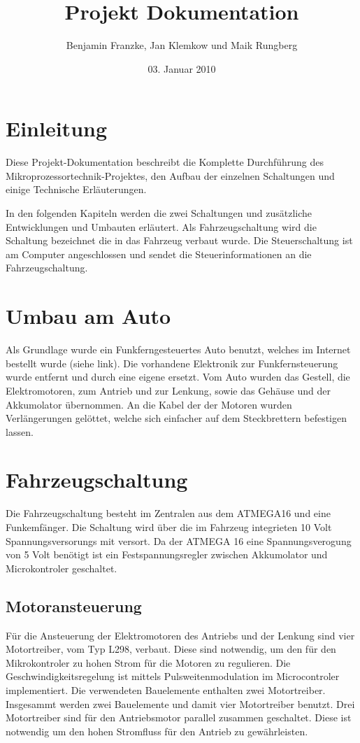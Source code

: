 \documentclass{scrartcl}
\title{Projekt Dokumentation}
\author{Benjamin Franzke, Jan Klemkow und Maik Rungberg}
\date{03. Januar 2010}
\begin{document}
\maketitle
\tableofcontents

\section{Einleitung} %
	Diese Projekt-Dokumentation beschreibt die Komplette Durchführung des Mikroprozessortechnik-Projektes,
	den Aufbau der einzelnen Schaltungen und einige Technische Erläuterungen.

	In den folgenden Kapiteln werden die zwei Schaltungen und zusätzliche Entwicklungen und Umbauten erläutert.
	Als Fahrzeugschaltung wird die Schaltung bezeichnet die in das Fahrzeug verbaut wurde.
	Die Steuerschaltung ist am Computer angeschlossen und sendet die Steuerinformationen an die Fahrzeugschaltung.

\section{Umbau am Auto} %
	Als Grundlage wurde ein Funkferngesteuertes Auto benutzt,
	welches im Internet bestellt wurde (siehe link).
	Die vorhandene Elektronik zur Funkfernsteuerung wurde entfernt und durch eine eigene ersetzt.
	Vom Auto wurden das Gestell, die Elektromotoren, zum Antrieb und zur Lenkung,
	sowie das Gehäuse und der Akkumolator übernommen.
	An die Kabel der der Motoren wurden Verlängerungen gelöttet,
	welche sich einfacher auf dem Steckbrettern befestigen lassen.

\section{Fahrzeugschaltung} %
	Die Fahrzeugschaltung besteht im Zentralen aus dem ATMEGA16 und eine Funkemfänger.
	Die Schaltung wird über die im Fahrzeug integrieten 10 Volt Spannungsversorungs mit versort.
	Da der ATMEGA 16 eine Spannungsverogung von 5 Volt benötigt ist ein Festspannungsregler
	zwischen Akkumolator und Microkontroler geschaltet.

	\subsection{Motoransteuerung}
		Für die Ansteuerung der Elektromotoren des Antriebs und der Lenkung sind vier Motortreiber, vom Typ L298, verbaut.
		Diese sind notwendig, um den für den Mikrokontroler zu hohen Strom für die Motoren zu regulieren.
		Die Geschwindigkeitsregelung ist mittels Pulsweitenmodulation im Microcontroler implementiert.
		Die verwendeten Bauelemente enthalten zwei Motortreiber. Insgesammt werden zwei Bauelemente und damit vier Motortreiber benutzt.
		Drei Motortreiber sind für den Antriebsmotor parallel zusammen geschaltet.
		Diese ist notwendig um den hohen Stromfluss für den Antrieb zu gewährleisten.
		
\end{document}
